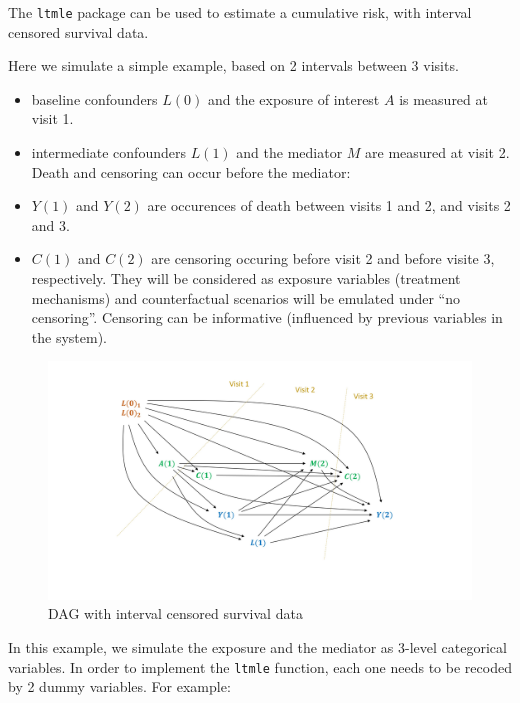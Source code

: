 \documentclass[
]{book}
\providecommand{\tightlist}{%
  \setlength{\itemsep}{0pt}\setlength{\parskip}{0pt}}
\begin{document}
The \texttt{ltmle} package can be used to estimate a cumulative risk, with interval censored survival data.

Here we simulate a simple example, based on 2 intervals between 3 visits.

\begin{itemize}
\tightlist
\item
  baseline confounders \(L(0)\) and the exposure of interest \(A\) is measured at visit 1.
\item
  intermediate confounders \(L(1)\) and the mediator \(M\) are measured at visit 2. Death and censoring can occur before the mediator:
\item
  \(Y(1)\) and \(Y(2)\) are occurences of death between visits 1 and 2, and visits 2 and 3.
\item
  \(C(1)\) and \(C(2)\) are censoring occuring before visit 2 and before visite 3, respectively. They will be considered as exposure variables (treatment mechanisms) and counterfactual scenarios will be emulated under ``no censoring''. Censoring can be informative (influenced by previous variables in the system).
\end{itemize}

\begin{figure}

{\centering \includegraphics[width=1\linewidth]{./images/DAG_survival} 

}

\caption{DAG with interval censored survival data}\label{fig:figDAG2}
\end{figure}

In this example, we simulate the exposure and the mediator as 3-level categorical variables. In order to implement the \texttt{ltmle} function, each one needs to be recoded by 2 dummy variables. For example:
\end{document}
